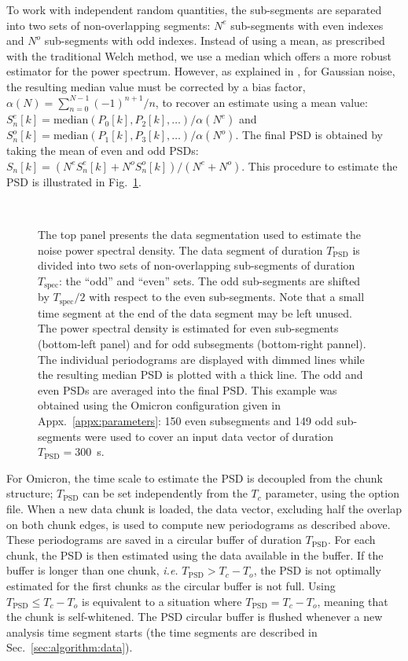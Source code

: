 To work with independent random quantities, the sub-segments are separated into two sets of non-overlapping segments: $N^e$ sub-segments with even indexes and $N^o$ sub-segments with odd indexes. Instead of using a mean, as prescribed with the traditional Welch method, we use a median which offers a more robust estimator for the power spectrum. However, as explained in \cite{Allen:2005fk}, for Gaussian noise, the resulting median value must be corrected by a bias factor, $\alpha(N)=\sum_{n=0}^{N-1}{(-1)^{n+1}/n}$, to recover an estimate using a mean value: $S_n^e[k]=\mathrm{median}(P_0[k], P_2[k],\dots)/\alpha(N^e)$ and $S_n^o[k]=\mathrm{median}(P_1[k], P_3[k],\dots)/\alpha(N^o)$. The final PSD is obtained by taking the mean of even and odd PSDs: $S_n[k]=(N^eS_n^e[k]+N^oS_n^o[k])/(N^e+N^o)$. This procedure to estimate the PSD is illustrated in Fig.~\ref{fig:psdseg}.
\begin{figure}
  \center
   \\
  \caption{The top panel presents the data segmentation used to estimate the noise power spectral density. The data segment of duration $T_\mathrm{PSD}$ is divided into two sets of non-overlapping sub-segments of duration $T_\mathrm{spec}$: the ``odd'' and ``even'' sets. The odd sub-segments are shifted by $T_\mathrm{spec}/2$ with respect to the even sub-segments. Note that a small time segment at the end of the data segment may be left unused. The power spectral density is estimated for even sub-segments (bottom-left panel) and for odd subsegments (bottom-right pannel). The individual periodograms are displayed with dimmed lines while the resulting median PSD is plotted with a thick line. The odd and even PSDs are averaged into the final PSD. This example was obtained using the Omicron configuration given in Appx.~\ref{appx:parameters}: 150 even subsegments and 149 odd sub-segments were used to cover an input data vector of duration $T_\mathrm{PSD}=300$~s.}
  \label{fig:psdseg}
\end{figure}

For Omicron, the time scale to estimate the PSD is decoupled from the chunk structure; $T_\mathrm{PSD}$ can be set independently from the $T_c$ parameter, using the option file. When a new data chunk is loaded, the data vector, excluding half the overlap on both chunk edges, is used to compute new periodograms as described above. These periodograms are saved in a circular buffer of duration $T_\mathrm{PSD}$. For each chunk, the PSD is then estimated using the data available in the buffer. If the buffer is longer than one chunk, \textit{i.e.} $T_\mathrm{PSD} > T_c-T_o$, the PSD is not optimally estimated for the first chunks as the circular buffer is not full. Using $T_\mathrm{PSD} \le T_c-T_o$ is equivalent to a situation where $T_\mathrm{PSD} = T_c-T_o$, meaning that the chunk is self-whitened. The PSD circular buffer is flushed whenever a new analysis time segment starts (the time segments are described in Sec.~\ref{sec:algorithm:data}). 

